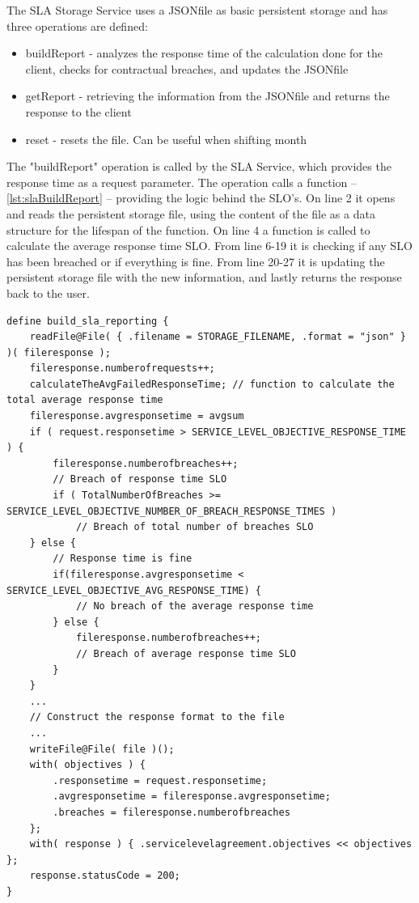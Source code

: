 \documentclass[12pt]{article}
\begin{document}
The SLA Storage Service uses a JSON\-file as basic persistent storage and has three operations are defined:
\begin{itemize}
    \item buildReport - analyzes the response time of the calculation done for the client, checks for contractual breaches, and updates the JSON\-file
    \item getReport - retrieving the information from the JSON\-file and returns the response to the client
    \item reset - resets the file. Can be useful when shifting month
\end{itemize}

The "buildReport" operation is called by the SLA Service, which provides the response time as a request parameter. The operation calls a function -- \ref{lst:slaBuildReport} -- providing the logic behind the SLO's. On line 2 it opens and reads the persistent storage file, using the content of the file as a data structure for the lifespan of the function. On line 4 a function is called to calculate the average response time SLO. From line 6-19 it is checking if any SLO has been breached or if everything is fine. From line 20-27 it is updating the persistent storage file with the new information, and lastly returns the response back to the user. 

\begin{lstlisting}[caption=Updates persistent storage file and checks for contractual breaches, captionpos=b, label=slaBuildReport, frame=single]
define build_sla_reporting {
    readFile@File( { .filename = STORAGE_FILENAME, .format = "json" } )( fileresponse );
    fileresponse.numberofrequests++;
    calculateTheAvgFailedResponseTime; // function to calculate the total average response time 
    fileresponse.avgresponsetime = avgsum
    if ( request.responsetime > SERVICE_LEVEL_OBJECTIVE_RESPONSE_TIME ) {
        fileresponse.numberofbreaches++;
        // Breach of response time SLO
        if ( TotalNumberOfBreaches >= SERVICE_LEVEL_OBJECTIVE_NUMBER_OF_BREACH_RESPONSE_TIMES ) 
            // Breach of total number of breaches SLO
    } else {
        // Response time is fine
        if(fileresponse.avgresponsetime < SERVICE_LEVEL_OBJECTIVE_AVG_RESPONSE_TIME) {
            // No breach of the average response time
        } else {
            fileresponse.numberofbreaches++;
            // Breach of average response time SLO
        }
    }
    ...
    // Construct the response format to the file
    ...
    writeFile@File( file )();
    with( objectives ) {
        .responsetime = request.responsetime;
        .avgresponsetime = fileresponse.avgresponsetime;
        .breaches = fileresponse.numberofbreaches
    };
    with( response ) { .servicelevelagreement.objectives << objectives };
    response.statusCode = 200;
}
\end{lstlisting}
\end{document}
